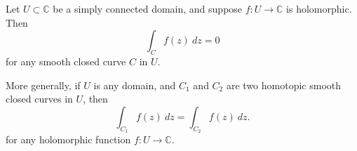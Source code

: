 \documentclass[12pt]{article}
\begin{document}
Let $U \subset \mathbb{C}$ be a simply connected domain, and suppose $f: U \longrightarrow \mathbb{C}$ is holomorphic. Then
$$
\int_C f(z)\ dz = 0
$$
for any smooth closed curve $C$ in $U$.

More generally, if $U$ is any domain, and $C_1$ and $C_2$ are two homotopic smooth closed curves in $U$, then
$$
\int_{C_1} f(z)\ dz = \int_{C_2} f(z)\ dz.
$$
for any holomorphic function $f: U \longrightarrow \mathbb{C}$.
\end{document}
